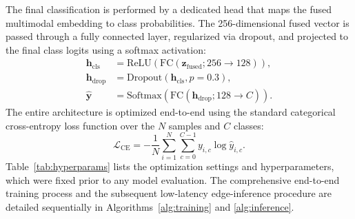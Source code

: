 \documentclass[preprint,12pt]{elsarticle}
\begin{document}
The final classification is performed by a dedicated head that maps
the fused multimodal embedding to class probabilities. The
256-dimensional fused vector is passed through a fully connected
layer, regularized via dropout, and projected to the final class
logits using a softmax activation:
\begin{align}
  \mathbf{h}_\mathrm{cls}  &= \mathrm{ReLU}\!\left(
      \mathrm{FC}(\mathbf{z}_\mathrm{fused};256\!\to\!128)\right), \\
  \mathbf{h}_\mathrm{drop} &= \mathrm{Dropout}(
      \mathbf{h}_\mathrm{cls},p{=}0.3), \\
  \hat{\mathbf{y}} &= \mathrm{Softmax}\!\left(
      \mathrm{FC}(\mathbf{h}_\mathrm{drop};128\!\to\!C)\right).
\end{align}
The entire architecture is optimized end-to-end using the standard
categorical cross-entropy loss function over the $N$ samples and $C$
classes:
\begin{equation}
  \mathcal{L}_\mathrm{CE} =
  -\frac{1}{N}\sum_{i=1}^{N}\sum_{c=0}^{C-1}
  y_{i,c}\log\hat{y}_{i,c}.
\end{equation}
Table~\ref{tab:hyperparams} lists the optimization settings and
hyperparameters, which were fixed prior to any model evaluation. The
comprehensive end-to-end training process and the subsequent
low-latency edge-inference procedure are detailed sequentially in
Algorithms~\ref{alg:training} and \ref{alg:inference}.
\end{document}
